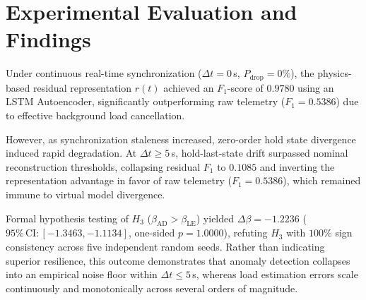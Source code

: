 
\section{Experimental Evaluation and Findings}
Under continuous real-time synchronization ($\Delta t = 0$\,s, $P_{\text{drop}} = 0\%$), the physics-based residual representation $r(t)$ achieved an $F_1$-score of $0.9780$ using an LSTM Autoencoder, significantly outperforming raw telemetry ($F_1 = 0.5386$) due to effective background load cancellation.

However, as synchronization staleness increased, zero-order hold state divergence induced rapid degradation. At $\Delta t \ge 5$\,s, hold-last-state drift surpassed nominal reconstruction thresholds, collapsing residual $F_1$ to $0.1085$ and inverting the representation advantage in favor of raw telemetry ($F_1 = 0.5386$), which remained immune to virtual model divergence.

Formal hypothesis testing of $H_3$ ($\beta_{\text{AD}} > \beta_{\text{LE}}$) yielded $\Delta\beta = -1.2236$ ($95\%\, \text{CI}: [-1.3463, -1.1134]$, one-sided $p = 1.0000$), refuting $H_3$ with $100\%$ sign consistency across five independent random seeds. Rather than indicating superior resilience, this outcome demonstrates that anomaly detection collapses into an empirical noise floor within $\Delta t \le 5$\,s, whereas load estimation errors scale continuously and monotonically across several orders of magnitude.
